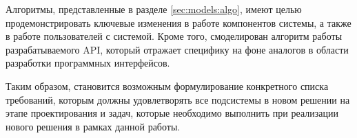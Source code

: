 	Алгоритмы, представленные в разделе \ref{sec:models:algo}, имеют целью продемонстрировать ключевые изменения в работе компонентов системы, а также в работе пользователей с системой. Кроме того, смоделирован алгоритм работы разрабатываемого API, который отражает специфику на фоне аналогов в области разработки программных интерфейсов.

	Таким образом, становится возможным формулирование конкретного списка требований, которым должны удовлетворять все подсистемы в новом решении на этапе проектирования и задач, которые необходимо выполнить при реализации нового решения в рамках данной работы.
